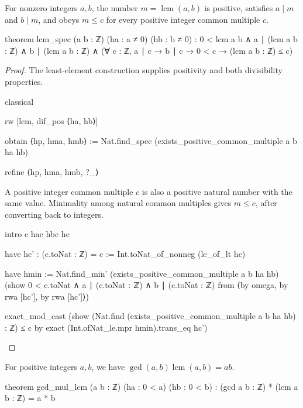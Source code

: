 \begin{theorem} \label{nt:thm:lcm-spec}
  For nonzero integers $a,b$, the number $m=\operatorname{lcm}(a,b)$ is positive, satisfies $a\mid m$ and $b\mid m$, and obeys $m\le c$ for every positive integer common multiple $c$.

  \begin{lean}
    theorem lcm_spec (a b : ℤ) (ha : a ≠ 0) (hb : b ≠ 0) :
        0 < lcm a b ∧ a ∣ (lcm a b : ℤ) ∧ b ∣ (lcm a b : ℤ) ∧
          (∀ c : ℤ, a ∣ c → b ∣ c → 0 < c → (lcm a b : ℤ) ≤ c)
  \end{lean}
\end{theorem}

\begin{proof}

  The least-element construction supplies positivity and both divisibility properties.

  \begin{lean}
    classical

    rw [lcm, dif_pos ⟨ha, hb⟩]

    obtain ⟨hp, hma, hmb⟩ := Nat.find_spec (exists_positive_common_multiple a b ha hb)

    refine ⟨hp, hma, hmb, ?_⟩
  \end{lean}

  A positive integer common multiple $c$ is also a positive natural number with the same value. Minimality among natural common multiples gives $m\le c$, after converting back to integers.

  \begin{lean}
    intro c hac hbc hc

    have hc' : (c.toNat : ℤ) = c := Int.toNat_of_nonneg (le_of_lt hc)

    have hmin := Nat.find_min' (exists_positive_common_multiple a b ha hb)
      (show 0 < c.toNat ∧ a ∣ (c.toNat : ℤ) ∧ b ∣ (c.toNat : ℤ) from
        ⟨by omega, by rwa [hc'], by rwa [hc']⟩)

    exact_mod_cast (show (Nat.find (exists_positive_common_multiple a b ha hb) : ℤ) ≤ c by
      exact (Int.ofNat_le.mpr hmin).trans_eq hc')
  \end{lean}

\end{proof}

\begin{theorem} \label{nt:thm:gcd-lcm-product}
  For positive integers $a,b$, we have $\gcd(a,b)\operatorname{lcm}(a,b)=ab$.

  \begin{lean}
    theorem gcd_mul_lcm (a b : ℤ) (ha : 0 < a) (hb : 0 < b) :
        (gcd a b : ℤ) * (lcm a b : ℤ) = a * b
  \end{lean}
\end{theorem}

